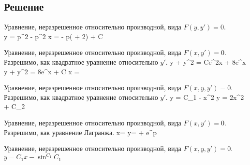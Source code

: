 \subsection{Решение}
\begin{enumerate}
    \solutionItemFirst
        {\equationFirst}
        {
        	Уравнение, неразрешенное относительно производной,
        	вида $ F(y, y') = 0 $. \\
        }
        {
        	\customCases
        		{y = p^2 - p^2 }
        		{x =  - p( + 2) + C}
        }

	\clearpage

    \solutionItemFirst
	    {\equationSecond}
	    {
	    	Уравнение, неразрешенное относительно производной,
	    	вида $ F(x, y') = 0 $. \\
	    	Разрешимо, как квадратное уравнение относительно $ y' $.
    	}
	    {
	    	\customCases
				{y + y^2 = Ce^{2x} + 8e^x}
				{ y + y^2 = 8e^x + C}
	    		{x = }
    	}

	\vspace{2em}

	\solutionItemFirst
		{\equationThird}
		{
			Уравнение, неразрешенное относительно производной,
			вида $ F(x, y, y') = 0 $. \\
			Разрешимо, как квадратное уравнение относительно $ y' $.
		}
		{
			\customCases
				{{y} = C_1 - x^2}
				{{y} = 2x^2 + C_2}
		}

	\vspace{2em}

	\solutionItemFirst
		{\equationFourth}
		{
			Уравнение, неразрешенное относительно производной,
			вида $ F(x, y') = 0 $. \\
			Разрешимо, как уравнение Лагранжа.
		}
		{
			\customCases
				{x=}	
				{y= + e^p}
		}

	\clearpage

	\solutionItemFirst
		{\equationFifth}
		{
			Уравнение, неразрешенное относительно производной,
			вида $ F(x, y, y') = 0 $. \\
		}
		{$ y=C_1x-\sin^{C_1}{C_1} $}

\end{enumerate} 
